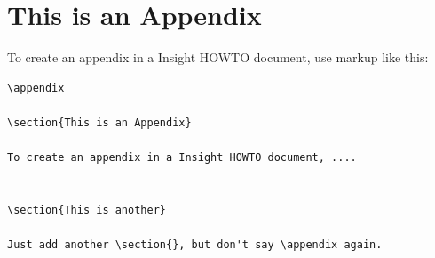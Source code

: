 \documentclass{InsightArticle}
\begin{document}






\appendix

\section{This is an Appendix}

To create an appendix in a Insight HOWTO document, use markup like
this:

\begin{verbatim}
\appendix

\section{This is an Appendix}

To create an appendix in a Insight HOWTO document, ....


\section{This is another}

Just add another \section{}, but don't say \appendix again.
\end{verbatim}


%
%



%
%
\end{document}
